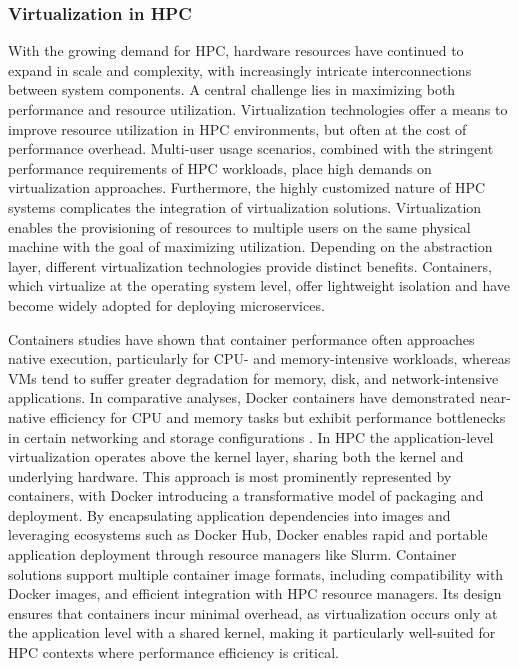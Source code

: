 \subsubsection{Virtualization in HPC}
\label{sec:background_hpc_virtualization}
With the growing demand for HPC, hardware resources have continued to expand in scale and complexity, with increasingly intricate interconnections between system components. A central challenge lies in maximizing both performance and resource utilization. Virtualization technologies offer a means to improve resource utilization in HPC environments, but often at the cost of performance overhead. Multi-user usage scenarios, combined with the stringent performance requirements of HPC workloads, place high demands on virtualization approaches. Furthermore, the highly customized nature of HPC systems complicates the integration of virtualization solutions.
Virtualization enables the provisioning of resources to multiple users on the same physical machine with the goal of maximizing utilization. Depending on the abstraction layer, different virtualization technologies provide distinct benefits. Containers, which virtualize at the operating system level, offer lightweight isolation and have become widely adopted for deploying microservices.


Containers studies have shown that container performance often approaches native execution, particularly for CPU- and memory-intensive workloads, whereas VMs tend to suffer greater degradation for memory, disk, and network-intensive applications. In comparative analyses, Docker containers have demonstrated near-native efficiency for CPU and memory tasks but exhibit performance bottlenecks in certain networking and storage configurations \cite{8397647}.
In HPC the application-level virtualization operates above the kernel layer, sharing both the kernel and underlying hardware. This approach is most prominently represented by containers, with Docker introducing a transformative model of packaging and deployment. By encapsulating application dependencies into images and leveraging ecosystems such as Docker Hub, Docker enables rapid and portable application deployment through resource managers like Slurm.
Container solutions support multiple container image formats, including compatibility with Docker images, and efficient integration with HPC resource managers. Its design ensures that containers incur minimal overhead, as virtualization occurs only at the application level with a shared kernel, making it particularly well-suited for HPC contexts where performance efficiency is critical.

